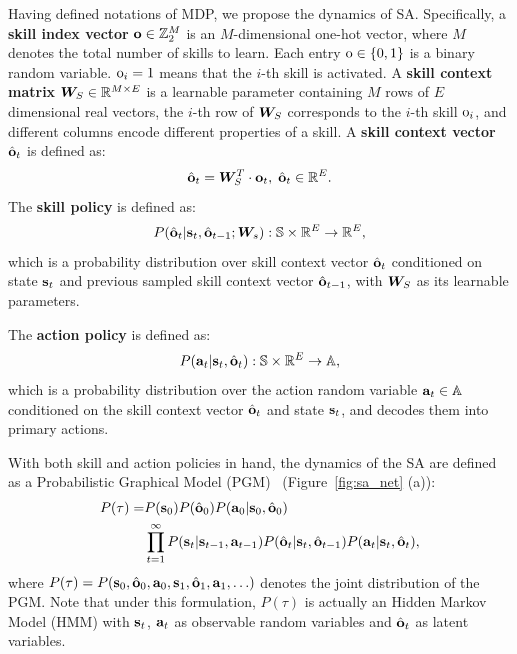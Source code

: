 Having defined notations of MDP, we propose the dynamics of SA.
Specifically, a \textbf{skill index vector} ${\mathbf{o}}\in{\mathbb{Z}}^M_2$ is
an $M$-dimensional one-hot vector, where $M$ denotes the total
number of skills to learn. Each entry ${\textnormal{o}}\in\{0,1\}$ is a binary
random variable. ${\textnormal{o}}_i=1$ means that the $i$-th skill is
activated. A \textbf{skill context matrix}
\cite{kosiorek2019stacked} ${\bm{W}}_S\in {\mathbb{R}}^{M\times E}$ is a
learnable parameter containing $M$ rows of $E$ dimensional real
vectors, the $i$-th row of ${\bm{W}}_S$ corresponds to the $i$-th
skill ${\textnormal{o}}_i$, and different columns encode different properties
of a skill. A \textbf{skill context vector} $\hat{{\mathbf{o}}}_t$ is
defined as:
\begin{equation}
  \label{eq:sa_skill_vector}
  \hat{{\mathbf{o}}}_t={\bm{W}}_S^{T}\cdot{\mathbf{o}}_t, \;\hat{{\mathbf{o}}}_t\in {\mathbb{R}}^{E}.
\end{equation}
The \textbf{skill policy} is defined as:
\begin{equation}
  \label{eq:sa_o_p}
  P(\hat{{\mathbf{o}}}_t|{\mathbf{s}}_t,\hat{{\mathbf{o}}}_{t-1};{\bm{W}}_s): {\mathbb{S}}\times{\mathbb{R}}^{E} \rightarrow {\mathbb{R}}^{E},
\end{equation}
which is a probability distribution over skill context vector
$\hat{{\mathbf{o}}}_{t}$ conditioned on state ${\mathbf{s}}_t$ and previous
sampled skill context vector $\hat{{\mathbf{o}}}_{t-1}$, with ${\bm{W}}_S$ as
its learnable parameters.

The \textbf{action policy} is defined as:
\begin{equation}
  \label{eq:sa_a_p}
  P({\mathbf{a}}_t|{\mathbf{s}}_t,\hat{{\mathbf{o}}}_t): {\mathbb{S}}\times{\mathbb{R}}^E\rightarrow{\mathbb{A}},
\end{equation}
which is a probability distribution over the action random
variable ${\mathbf{a}}_t\in{\mathbb{A}}$ conditioned on the skill context vector
$\hat{{\mathbf{o}}}_t$ and state ${\mathbf{s}}_t$, and decodes them into primary
actions.

With both skill and action policies in hand, the dynamics of the
SA are defined as a Probabilistic Graphical Model
(PGM)~\cite{koller2009probabilistic} (Figure~\ref{fig:sa_net}
(a)):
\begin{align}
  \label{eq:sa_pgm_joint}
  \nonumber  P(\tau) = &P({\mathbf{s}}_0)P(\hat{{\mathbf{o}}}_0)P({\mathbf{a}}_0|{\mathbf{s}}_0,\hat{{\mathbf{o}}}_0)\\
                       &\prod_{t=1}^\infty P({\mathbf{s}}_t|{\mathbf{s}}_{t-1},{\mathbf{a}}_{t-1})P(\hat{{\mathbf{o}}}_t|{\mathbf{s}}_t,\hat{{\mathbf{o}}}_{t-1})P({\mathbf{a}}_{t}|{\mathbf{s}}_{t},\hat{{\mathbf{o}}}_{t}),
\end{align}
where
$P(\tau)=P({\mathbf{s}}_0,\hat{{\mathbf{o}}}_0,{\mathbf{a}}_0,{\mathbf{s}}_1,\hat{{\mathbf{o}}}_1,{\mathbf{a}}_1,\ldots)$
denotes the joint distribution of the PGM. Note that under this
formulation, $P(\tau)$ is actually an Hidden Markov Model (HMM)
with ${\mathbf{s}}_t$, ${\mathbf{a}}_t$ as observable random variables and
$\hat{{\mathbf{o}}}_t$ as latent variables.

